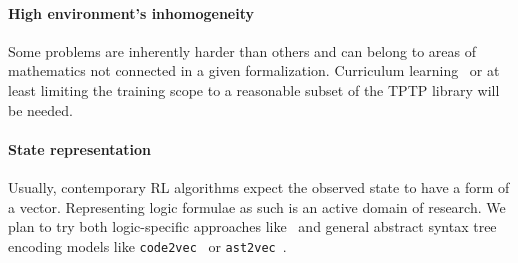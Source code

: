 \documentclass{easychair}
\begin{document}
\paragraph{High environment's inhomogeneity} Some problems are inherently harder than others and can belong to areas of mathematics not connected in a given formalization. Curriculum learning~\cite{CurriculumLearning} or at least limiting the training scope to a reasonable subset of the TPTP library will be needed.
\paragraph{State representation} Usually, contemporary RL algorithms expect the observed state to have a form of a vector. Representing logic formulae as such is an active domain of research. We plan to try both logic-specific approaches like~\cite{VectorRepresentations} and general abstract syntax tree encoding models like \texttt{code2vec}~\cite{alon2019code2vec} or \texttt{ast2vec}~\cite{Paassen2022}.
\label{sect:bib}


\end{document}

